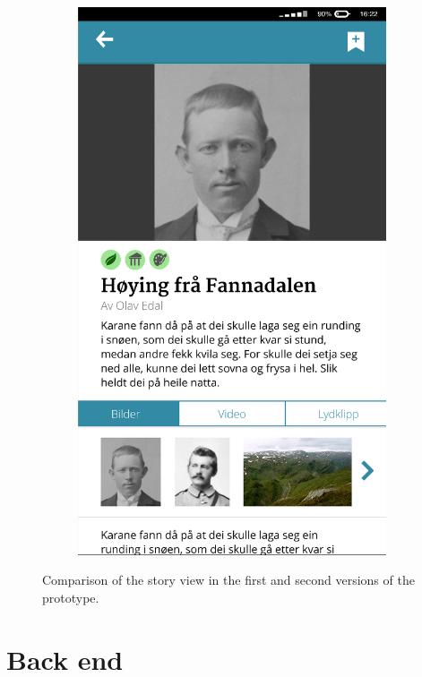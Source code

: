 \begin{figure}
\begin{subfigure}[h]{0.4\textwidth}
		\includegraphics[width=\textwidth]{fig/prototype2}
	\end{subfigure}
	\caption{Comparison of the story view in the first and second versions of the prototype.}
	\label{Fig:prototype}
\end{figure}

\section{Back end}

